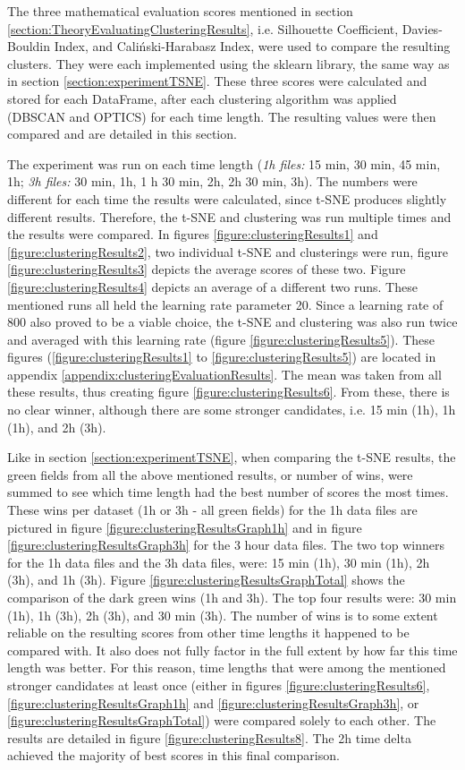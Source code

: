 
The three mathematical evaluation scores mentioned in section \ref{section:TheoryEvaluatingClusteringResults}, i.e. Silhouette Coefficient, Davies-Bouldin Index, and Caliński-Harabasz Index, were used to compare the resulting clusters.  They were each implemented using the sklearn library, the same way as in section \ref{section:experimentTSNE}. These three scores were calculated and stored for each DataFrame, after each clustering algorithm was applied (DBSCAN and OPTICS) for each time length. The resulting values were then compared and are detailed in this section.

The experiment was run on each time length (\textit{1h files:} 15 min, 30 min, 45 min, 1h; \textit{3h files:} 30 min, 1h, 1 h 30 min, 2h, 2h 30 min, 3h).
The numbers were different for each time the results were calculated, since t-SNE produces slightly different results. Therefore, the t-SNE and clustering was run multiple times and the results were compared. In figures \ref{figure:clusteringResults1} and \ref{figure:clusteringResults2}, two individual t-SNE and clusterings were run, figure \ref{figure:clusteringResults3} depicts the average scores of these two. Figure \ref{figure:clusteringResults4} depicts an average of a different two runs. These mentioned runs all held the learning rate parameter 20. Since a learning rate of 800 also proved to be a viable choice, the t-SNE and clustering was also run twice and averaged with this learning rate (figure \ref{figure:clusteringResults5}). These figures (\ref{figure:clusteringResults1} to \ref{figure:clusteringResults5}) are located in appendix \ref{appendix:clusteringEvaluationResults}. The mean was taken from all these results, thus creating figure \ref{figure:clusteringResults6}. From these, there is no clear winner, although there are some stronger candidates, i.e. 15 min (1h), 1h (1h), and 2h (3h). 

Like in section \ref{section:experimentTSNE}, when comparing the t-SNE results, the green fields from all the above mentioned results, or number of wins, were summed to see which time length had the best number of scores the most times. These wins per dataset (1h or 3h - all green fields) for the 1h data files are pictured in figure \ref{figure:clusteringResultsGraph1h} and in figure \ref{figure:clusteringResultsGraph3h} for the 3 hour data files. The two top winners for the 1h data files and the 3h data files, were: 15 min (1h), 30 min (1h), 2h (3h), and 1h (3h). Figure \ref{figure:clusteringResultsGraphTotal} shows the comparison of the dark green wins (1h and 3h). The top four results were: 30 min (1h), 1h (3h), 2h (3h), and 30 min (3h). The number of wins is to some extent reliable on the resulting scores from other time lengths it happened to be compared with. It also does not fully factor in the full extent by how far this time length was better. For this reason, time lengths that were among the mentioned stronger candidates at least once (either in figures \ref{figure:clusteringResults6}, \ref{figure:clusteringResultsGraph1h} and \ref{figure:clusteringResultsGraph3h}, or \ref{figure:clusteringResultsGraphTotal}) were compared solely to each other. The results are detailed in figure \ref{figure:clusteringResults8}. The 2h time delta achieved the majority of best scores in this final comparison. 

